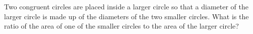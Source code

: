 Two congruent circles are placed inside a larger circle so that a diameter of the larger circle is made up of the diameters of the two smaller circles. What is the ratio of the area of one of the smaller circles to the area of the larger circle?
